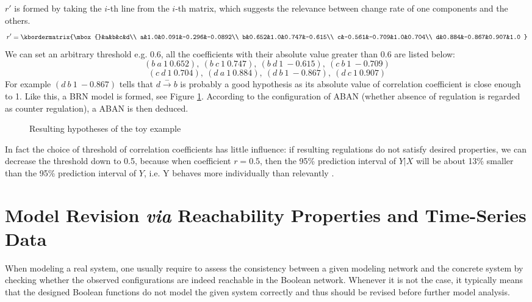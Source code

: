 $r'$ is formed by taking the $i$-th line from the $i$-th matrix, which suggests the relevance between change rate of one components and the others.
$$r'=\kbordermatrix{\mbox{}&a&b&c&d\\
a&1.0&0.091&-0.296&-0.0892\\
b&0.652&1.0&0.747&-0.615\\
c&-0.561&-0.709&1.0&0.704\\
d&0.884&-0.867&0.907&1.0
}$$
We can set an arbitrary threshold e.g. 0.6, all the coefficients with their absolute value greater than 0.6 are listed below:
$$(b\ a\ 1\ 0.652),\ (b\ c\ 1\ 0.747),\ (b\ d\ 1\ -0.615),\ (c\ b\ 1\ -0.709)$$
$$(c\ d\ 1\ 0.704),\ (d\ a\ 1\ 0.884),\ (d\ b\ 1\ -0.867),\ (d\ c\ 1\ 0.907)$$
For example $(d\ b\ 1\ -0.867)$ tells that $d\xrightarrow{-}b$ is probably a good hypothesis as its absolute value of correlation coefficient is close enough to 1. Like this, a BRN model is formed, see Figure \ref{ResultBRN}. According to the configuration of ABAN (whether absence of regulation is regarded as counter regulation), a ABAN is then deduced.

\begin{figure}[ht]
\centering

\caption{Resulting hypotheses of the toy example}\label{ResultBRN}
\end{figure}
In fact the choice of threshold of correlation coefficients has little influence: if resulting regulations do not satisfy desired properties, we can decrease the threshold down to 0.5, because when coefficient $r =0.5$, then the 95\% prediction interval of $Y|X$ will be about 13\% smaller than the 95\% prediction interval of $Y$, i.e. Y behaves more individually than relevantly \cite{hull1927correlation}.

\section{Model Revision \textit{via} Reachability Properties and Time-Series Data}
When modeling a real system, one usually require to assess the consistency between a given modeling network and the concrete system by checking whether the observed configurations are indeed reachable in the Boolean network.
Whenever it is not the case, it typically means that the designed Boolean functions do not model the given system correctly and thus should be revised before further model analysis.

